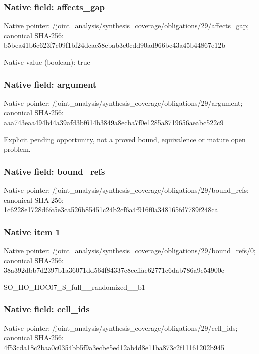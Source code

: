 \documentclass[10pt,a4paper]{article}
\begin{document}
\subsubsection{Native field: affects\_\allowbreak{}gap}
Native pointer: /joint\_\allowbreak{}analysis/synthesis\_\allowbreak{}coverage/obligations/29/affects\_\allowbreak{}gap; canonical SHA-256: b5bea41b6c623f7c09f1bf24dcae58ebab3c0cdd90ad966bc43a45b44867e12b

Native value (boolean): true

\subsubsection{Native field: argument}
Native pointer: /joint\_\allowbreak{}analysis/synthesis\_\allowbreak{}coverage/obligations/29/argument; canonical SHA-256: aaa743eaa494b44a39afd3bf614b3849a8ecba7f0e1285a8719656aeabc522c9

\begingroup\raggedright\sloppy Explicit pending opportunity,\allowbreak{} not a proved bound,\allowbreak{} equivalence or mature open problem.\par\endgroup

\subsubsection{Native field: bound\_\allowbreak{}refs}
Native pointer: /joint\_\allowbreak{}analysis/synthesis\_\allowbreak{}coverage/obligations/29/bound\_\allowbreak{}refs; canonical SHA-256: 1c6228e1728d6fc5e3ca526b85451c24b2cf6a4f916f0a348165fd7789f248ca

\subsubsection{Native item 1}
Native pointer: /joint\_\allowbreak{}analysis/synthesis\_\allowbreak{}coverage/obligations/29/bound\_\allowbreak{}refs/0; canonical SHA-256: 38a392dbb7d2397b1a36071dd564f84337c8ccffae62771c6dab786a9e54900e

\begingroup\raggedright\sloppy SO\_\allowbreak{}HO\_\allowbreak{}HOC07\_\allowbreak{}S\_\allowbreak{}full\_\allowbreak{}\_\allowbreak{}randomized\_\allowbreak{}\_\allowbreak{}b1\par\endgroup

\subsubsection{Native field: cell\_\allowbreak{}ids}
Native pointer: /joint\_\allowbreak{}analysis/synthesis\_\allowbreak{}coverage/obligations/29/cell\_\allowbreak{}ids; canonical SHA-256: 4f53cda18c2baa0c0354bb5f9a3ecbe5ed12ab4d8e11ba873c2f11161202b945
\end{document}
